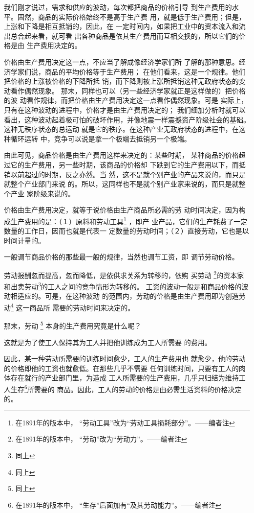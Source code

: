 \documentclass[a4paper,twoside,12pt,AutoFakeBold]{ctexart}
\begin{document}
我们刚才说过，需求和供应的波动，每次都把商品的价格引导
到生产费用的水平。固然，商品的实际价格始终不是高于生产费
用，就是低于生产费用；但是，上涨和下降是相互抵销的，因此，在
一定时间内，如果把工业中的资本流入和流出总合起来看，就可看
出各种商品是依其生产费用而互相交换的，所以它们的价格是由
生产费用决定的。

价格由生产费用决定这一点，不应当了解成像经济学家们所
了解的那种意思。经济学家们说，商品的平均价格等于生产费用；
在他们看来，这是一个规律。他们把价格的上涨被价格的下降所抵
销，而下降则被上涨所抵销这种无政府状态的变动看作偶然现象。
那末，同样也可以（另一些经济学家就正是这样做的）把价格的波
动看作规律，而把价格由生产费用决定这一点看作偶然现象。可是
实际上，只有在这种波动的进程中，价格才是由生产费用决定的；
我们细加分析时就可以看出，这种波动起着极可怕的破坏作用，并像地震一样震撼资产阶级社会的基础。这种无秩序状态的总运动
就是它的秩序。在这种产业无政府状态的进程中，在这种循环运转
中，竞争可以说是拿一个极端去抵销另一个极端。

由此可见，商品价格是由生产费用这样来决定的：某些时期，
某种商品的价格超过它的生产费用，另一些时期，该商品的价格却
下跌到它的生产费用以下，而抵销以前超过的时期，反之亦然。当
然，这不是就个别产业的产品来说的，而只是就整个产业部门来说
的。所以，这同样也不是就个别产业家来说的，而只是就整个产业
家阶级来说的。

价格由生产费用决定，就等于说价格由生产商品所必需的劳
动时间决定，因为构成生产费用的是：（１）原料和劳动工具\footnote{在1891年的版本中， “劳动工具”改为“劳动工具损耗部分”。——编者注} ，即产
业产品，它们的生产耗费了一定数量的工作日，因而也就是代表一
定数量的劳动时间；（２）直接劳动，它也是以时间计量的。

一般调节商品价格的那些最一般的规律，当然也调节工资，即
调节劳动价格。

劳动报酬忽而提高，忽而降低，是依供求关系为转移的，依购
买劳动 \footnote{在1891年的版本中， “劳动”改为“劳动力”。——编者注}的资本家和出卖劳动\footnote{同上}的工人之间的竞争情形为转移的。
工资的波动一般是和商品价格的波动相适应的。可是，在这种波动
的范围内，劳动的价格是由生产费用即为创造劳动\footnote{同上} 这一商品所
需要的劳动时间来决定的。

那末，劳动 \footnote{同上} 本身的生产费用究竟是什么呢？

这就是为了使工人保持其为工人并把他训练成为工人所需要
的费用。

因此，某一种劳动所需要的训练时间愈少，工人的生产费用也
就愈少，他的劳动的价格即他的工资也就愈低。在那些几乎不需要
任何训练时间，只要有工人的肉体存在就行的产业部门里，为造成
工人所需要的生产费用，几乎只归结为维持工人生存\footnote{在1891年的版本中， “生存”后面加有“及其劳动能力”。——编者注}所需要的
商品。因此，工人的劳动的价格是由必需生活资料的价格决定的。
\end{document}
